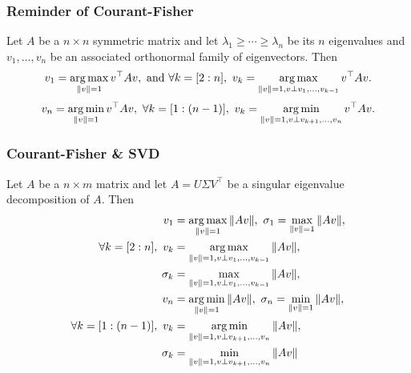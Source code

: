 \documentclass{beamer}
\begin{document}
\begin{frame}[t]
\frametitle{Reminder of Courant-Fisher}
\begin{theorem} 
Let $A$ be a $n \times n$ symmetric matrix and let $\lambda_1 \geq \cdots \geq \lambda_n$ be its $n$ eigenvalues and $v_1,\dots,v_n$ be an associated orthonormal family of eigenvectors. Then
\begin{align*}
v_1 = \argmax_{\|v\|=1} v^\top A v, \text{ and } \forall k = [2:n], \ v_k = \argmax_{\|v\|=1, v \perp v_1,\dots, v_{k-1}} v^\top A v.
\end{align*}
\begin{align*}
v_n = \operatorname*{arg\,min}_{\|v\|=1} v^\top A v, \ \forall k = [1:(n-1)], \ v_k = \operatorname*{arg\,min}_{\|v\|=1, v \perp v_{k+1},\dots, v_{n}} v^\top A v.
\end{align*}
\end{theorem}
\end{frame}

\begin{frame}[t]
\frametitle{Courant-Fisher \& SVD}
\begin{theorem} 
Let $A$ be a $n \times m$ matrix and let $A=U \Sigma V^\top$ be a singular eigenvalue decomposition of $A$. Then
\begin{align*}
v_1 &= \operatorname*{arg\,max}_{\|v\|=1} \|A v\|, \ \sigma_1 = \max_{\|v\|=1} \|A v\|, \\ \forall k = [2:n], \ v_k &= \operatorname*{arg\,max}_{\|v\|=1, v \perp v_1,\dots, v_{k-1}} \|A v\|,  \\ \sigma_k &= \max_{\|v\|=1, v \perp v_1,\dots, v_{k-1}} \|A v\|, \\ 
v_n &= \operatorname*{arg\,min}_{\|v\|=1} \|A v\|, \ \sigma_n = \min_{\|v\|=1} \|A v\|, \\ \forall k = [1:(n-1)], \ v_k &= \operatorname*{arg\,min}_{\|v\|=1, v \perp v_{k+1},\dots, v_{n}} \|A v\|, \\  \sigma_k &= \min_{\|v\|=1, v \perp v_{k+1},\dots, v_{n}} \|A v\|
\end{align*}
\end{theorem}
\end{frame}
\end{document}
